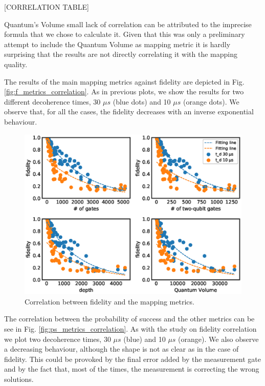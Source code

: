 [CORRELATION TABLE]

Quantum's Volume small lack of correlation can be attributed to the imprecise formula that we chose to calculate it.
Given that this was only a preliminary attempt to include the Quantum Volume as mapping metric it is hardly surprising that the results are not directly correlating it with the mapping quality.

The results of the main mapping metrics against fidelity are depicted in Fig. \ref{fig:f_metrics_correlation}.
As in previous plots, we show the results for two different decoherence times, 30 \(\mu s\) (blue dots) and 10 \(\mu s\) (orange dots).
We observe that, for all the cases, the fidelity decreases with an inverse exponential behaviour.

\begin{figure}[htbp]
\centering
\includegraphics[width=\textwidth]{figures/f_metrics_correlation.eps}
\caption{\label{fig:orgef181b5}
Correlation between fidelity and the mapping metrics.}
\end{figure}

The correlation between the probability of success and the other metrics can be see in Fig. \ref{fig:ps_metrics_correlation}.
As with the study on fidelity correlation we plot two decoherence times, 30 \(\mu s\) (blue) and 10 \(\mu s\) (orange).
We also observe a decreasing behaviour, although the shape is not as clear as in the case of fidelity.
This could be provoked by the final error added by the measurement gate and by the fact that, most of the times, the measurement is correcting the wrong solutions.

